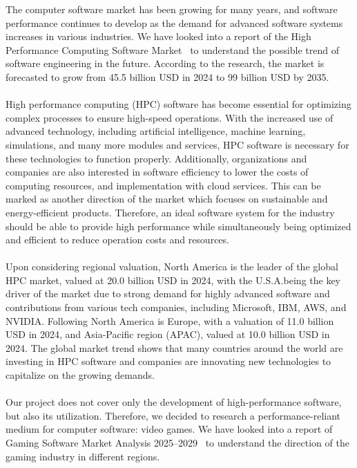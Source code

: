 The computer software market has been growing for many years, and software performance continues to develop 
as the demand for advanced software systems increases in various industries.
We have looked into a report of the High Performance Computing Software Market~\cite{HPC_Software_Market_Research} to
understand the possible trend of software engineering in the future.
According to the research, the market is forecasted to grow from 45.5 billion USD in 2024 to 99 billion USD by 2035.
\\\\
High performance computing (HPC) software has become essential for optimizing complex processes to ensure high-speed operations.
With the increased use of advanced technology, including artificial intelligence, machine learning, simulations, and many more 
modules and services, HPC software is necessary for these technologies to function properly.
Additionally, organizations and companies are also interested in software efficiency to lower the costs of computing resources, 
and implementation with cloud services.
This can be marked as another direction of the market which focuses on sustainable and energy-efficient products.
Therefore, an ideal software system for the industry should be able to provide high performance while simultaneously being 
optimized and efficient to reduce operation costs and resources.
\\\\
Upon considering regional valuation, North America is the leader of the global HPC market, valued at 20.0 billion USD in 2024, 
with the U.S.A.being the key driver of the market due to strong demand for highly advanced software and contributions from
various tech companies, including Microsoft, IBM, AWS, and NVIDIA\@.
Following North America is Europe, with a valuation of 11.0 billion USD in 2024, and Asia-Pacific region (APAC), valued at 
10.0 billion USD in 2024.
The global market trend shows that many countries around the world are investing in HPC software and companies are innovating 
new technologies to capitalize on the growing demands.
\\\\
Our project does not cover only the development of high-performance software, but also its utilization.
Therefore, we decided to research a performance-reliant medium for computer software: video games.
We have looked into a report of Gaming Software Market Analysis 2025--2029~\cite{Gaming_Software_Market_Analysis} to understand the direction of
the gaming industry in different regions.
